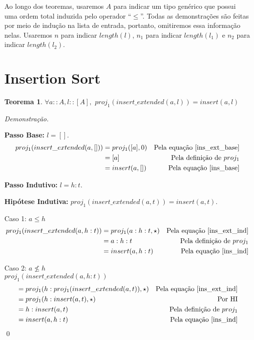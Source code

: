 \documentclass[12pt, oneside, a4paper,english,brazil]{abntex2}
\begin{document}
\qquad Ao longo dos teoremas, usaremos $A$ para indicar um tipo gen\'erico que possui uma ordem total induzida pelo operador ``$\le$''. Todas as demonstra\c{c}\~oes s\~ao feitas por meio de indu\c{c}\~ao na lista de entrada, portanto, omitiremos essa informa\c{c}\~ao nelas. Usaremos $n$ para indicar $length(l)$, $n_{1}$ para indicar $length(l_{1})$ e $n_{2}$ para indicar $length(l_{2})$.

\section{Insertion Sort}

\newtheorem{teorema}{Teorema}[section]

\begin{teorema} \label{insert_eq}
  $\forall a :: A, l :: [A], \,\, proj_1(insert\_extended(a, l)) = insert(a, l)$
\end{teorema}
\noindent \textit{Demonstra\c{c}\~ao.}

  \textbf{Passo Base: } $l = []$.
  \begin{align*}
    proj_{1}(insert\_extended(a, [])) &= proj_{1}([a], 0)  &\text{Pela equa\c{c}\~ao \ref{ins_ext_base}} \\
                                      &= [a] &\text{Pela defini\c{c}\~ao de } proj_{1} \\
    &= insert(a, [])  &\text{Pela equa\c{c}\~ao \ref{ins_base}}
  \end{align*}

  \textbf{Passo Indutivo: } $l = h : t$.

  \textbf{Hip\'otese Indutiva: } $proj_{1}(insert\_extended(a, t)) = insert(a, t)$.

  Caso 1: $a \le h$
    \begin{align*}
      proj_{1}(insert\_extended(a, h : t)) &= proj_{1}(a : h : t, \star) &\text{Pela equa\c{c}\~ao \ref{ins_ext_ind}} \\
      &= a : h : t &\text{Pela defini\c{c}\~ao de } proj_1 \\
      &= insert(a, h : t) &\text{Pela equa\c{c}\~ao \ref{ins_ind}}
    \end{align*}
    \newpage

    Caso 2: $a \not\le h$ \\

      $proj_{1}(insert\_extended(a, h : t))$
    \begin{align*}
       &=  proj_{1}(h : proj_{1}(insert\_extended(a, t)), \star) &\text{Pela equa\c{c}\~ao \ref{ins_ext_ind}}\\
       &= proj_{1}(h : insert(a, t), \star) &\text{Por HI} \\
       &= h : insert(a, t) &\text{Pela defini\c{c}\~ao de $proj_{1}$} \\
      &= insert(a, h : t) &\text{Pela equa\c{c}\~ao \ref{ins_ind}}
    \end{align*}
\qed
\end{document}
